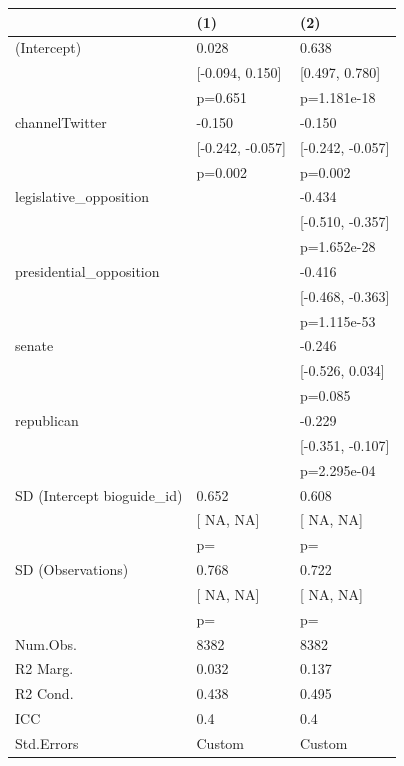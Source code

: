 \begin{tabular}{lll}
\hline
& (1) & (2) \\ \hline
(Intercept) & 0.028 & 0.638 \\
& [-0.094, 0.150] & [0.497, 0.780] \\
& p=0.651 & p=1.181e-18 \\
channelTwitter & -0.150 & -0.150 \\
& [-0.242, -0.057] & [-0.242, -0.057] \\
& p=0.002 & p=0.002 \\
legislative_opposition &  & -0.434 \\
&  & [-0.510, -0.357] \\
&  & p=1.652e-28 \\
presidential_opposition &  & -0.416 \\
&  & [-0.468, -0.363] \\
&  & p=1.115e-53 \\
senate &  & -0.246 \\
&  & [-0.526, 0.034] \\
&  & p=0.085 \\
republican &  & -0.229 \\
&  & [-0.351, -0.107] \\
&  & p=2.295e-04 \\
SD (Intercept bioguide_id) & 0.652 & 0.608 \\
& [  NA,   NA] & [  NA,   NA] \\
& p= & p= \\
SD (Observations) & 0.768 & 0.722 \\
& [  NA,   NA] & [  NA,   NA] \\
& p= & p= \\
Num.Obs. & 8382 & 8382 \\
R2 Marg. & 0.032 & 0.137 \\
R2 Cond. & 0.438 & 0.495 \\
ICC & 0.4 & 0.4 \\
Std.Errors & Custom & Custom \\
\hline
\end{tabular}
